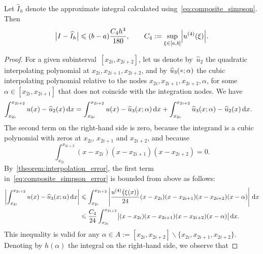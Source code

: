 \begin{theorem}
    \label{theorem:integration_error_simpson}
    Let $\widehat I_h$ denote the approximate integral calculated using~\eqref{eq:composite_simpson}.
    Then
    \begin{equation}
        \label{eq:error_bound_simpson}
        \bigl\lvert I - \widehat I_h \bigr\rvert
        \leq (b-a)\frac{C_4 h^4}{180},
        \qquad
        C_4 := \sup_{\xi \in [a, b]} \abs*{u^{(4)}(\xi)}.
    \end{equation}
\end{theorem}
\begin{proof}
For a given subinterval~$[x_{2i}, x_{2i+2}]$,
let us denote by~$\widehat u_2$ the quadratic interpolating polynomial at $x_{2i}, x_{2i+1}, x_{2i+2}$,
and by $\widehat u_3(\placeholder; \alpha)$ the cubic interpolating polynomial relative to the nodes $x_{2i}, x_{2i+1}, x_{2i+2}, \alpha$,
for some $\alpha \in [x_{2i}, x_{2i+1}]$ that does not coincide with the integration nodes.
We have
\begin{align}
    \label{eq:composite_simpson_error}
    \int_{x_{2i}}^{x_{2i+2}} u(x) - \widehat u_2(x) \, \d x
    &= \int_{x_{2i}}^{x_{2i+2}} u(x) - \widehat u_3(x; \alpha)  \, \d x + \int_{x_{2i}}^{x_{2i+2}} \widehat u_3(x; \alpha) - \widehat u_2(x)  \, \d x.
\end{align}
The second term on the right-hand side is zero,
because the integrand is a cubic polynomial with zeros at $x_{2i}$, $x_{2i+1}$ and $x_{2i+2}$,
and because
\[
    \int_{x_{2i}}^{x_{2i+2}} (x - x_{2i}) (x - x_{2i+1}) (x - x_{2i+2}) = 0.
\]
By~\cref{theorem:interpolation_error},
the first term in~\eqref{eq:composite_simpson_error} is bounded from above as follows:
\begin{align*}
    \abs*{\int_{x_{2i}}^{x_{2i+2}} u(x) - \widehat u_3(x; \alpha)  \, \d x}
    &\leq \int_{x_{2i}}^{x_{2i+2}} \left\lvert \frac{u^{(4)} \bigl(\xi(x)\bigr)}{24} (x-x_{2i})(x- x_{2i+1}) (x-x_{2i+2}) (x - \alpha) \right\rvert \, \d x \\
    &\leq \frac{C_4}{24} \int_{x_{2i}}^{x_{2i+2}} \bigl\lvert (x-x_{2i})(x- x_{2i+1}) (x-x_{2i+2}) (x - \alpha) \bigr\rvert \, \d x.
\end{align*}
This inequality is valid for any $\alpha \in A := [x_{2i}, x_{2i+2}] \backslash \{x_{2i}, x_{2i+1}, x_{2i+2}\}$.
Denoting by $h(\alpha)$ the integral on the right-hand side,
we observe that

\end{proof}
